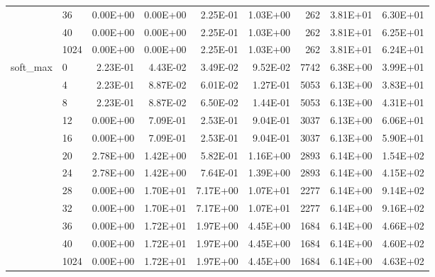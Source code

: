 \begin{longtable}{llrrrrrrr}
         & 36   &   0.00E+00 & 0.00E+00 & 2.25E-01 & 1.03E+00 &     262 &     3.81E+01 & 6.30E+01 \\
         & 40   &   0.00E+00 & 0.00E+00 & 2.25E-01 & 1.03E+00 &     262 &     3.81E+01 & 6.25E+01 \\
         & 1024 &   0.00E+00 & 0.00E+00 & 2.25E-01 & 1.03E+00 &     262 &     3.81E+01 & 6.24E+01 \\
soft\_max & 0    &   2.23E-01 & 4.43E-02 & 3.49E-02 & 9.52E-02 &    7742 &     6.38E+00 & 3.99E+01 \\
         & 4    &   2.23E-01 & 8.87E-02 & 6.01E-02 & 1.27E-01 &    5053 &     6.13E+00 & 3.83E+01 \\
         & 8    &   2.23E-01 & 8.87E-02 & 6.50E-02 & 1.44E-01 &    5053 &     6.13E+00 & 4.31E+01 \\
         & 12   &   0.00E+00 & 7.09E-01 & 2.53E-01 & 9.04E-01 &    3037 &     6.13E+00 & 6.06E+01 \\
         & 16   &   0.00E+00 & 7.09E-01 & 2.53E-01 & 9.04E-01 &    3037 &     6.13E+00 & 5.90E+01 \\
         & 20   &   2.78E+00 & 1.42E+00 & 5.82E-01 & 1.16E+00 &    2893 &     6.14E+00 & 1.54E+02 \\
         & 24   &   2.78E+00 & 1.42E+00 & 7.64E-01 & 1.39E+00 &    2893 &     6.14E+00 & 4.15E+02 \\
         & 28   &   0.00E+00 & 1.70E+01 & 7.17E+00 & 1.07E+01 &    2277 &     6.14E+00 & 9.14E+02 \\
         & 32   &   0.00E+00 & 1.70E+01 & 7.17E+00 & 1.07E+01 &    2277 &     6.14E+00 & 9.16E+02 \\
         & 36   &   0.00E+00 & 1.72E+01 & 1.97E+00 & 4.45E+00 &    1684 &     6.14E+00 & 4.66E+02 \\
         & 40   &   0.00E+00 & 1.72E+01 & 1.97E+00 & 4.45E+00 &    1684 &     6.14E+00 & 4.60E+02 \\
         & 1024 &   0.00E+00 & 1.72E+01 & 1.97E+00 & 4.45E+00 &    1684 &     6.14E+00 & 4.63E+02 \\
\end{longtable}
